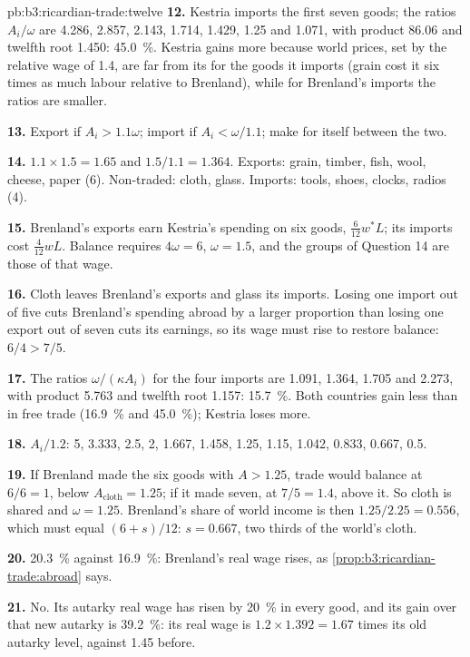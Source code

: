 \begin{solution}{pb:b3:ricardian-trade:twelve}
\textbf{12.} Kestria imports the first seven goods; the ratios $A_i/\omega$ are 4.286,
2.857, 2.143, 1.714, 1.429, 1.25 and 1.071, with product 86.06 and twelfth root 1.450:
45.0~\%. Kestria gains more because world prices, set by the relative wage of 1.4,
are far from its  for the goods it imports (grain cost it six
times as much labour relative to Brenland), while for Brenland's imports the
ratios are smaller.

\textbf{13.} Export if $A_i > 1.1\omega$; import if $A_i < \omega/1.1$; make for itself
between the two.

\textbf{14.} $1.1 \times 1.5 = 1.65$ and $1.5/1.1 = 1.364$. Exports: grain, timber, fish,
wool, cheese, paper (6). Non-traded: cloth, glass. Imports: tools, shoes, clocks,
radios (4).

\textbf{15.} Brenland's exports earn Kestria's spending on six goods, $\tfrac{6}{12}w^*L$;
its imports cost $\tfrac{4}{12}wL$. Balance requires $4\omega = 6$, $\omega = 1.5$, and the
groups of Question 14 are those of that wage.

\textbf{16.} Cloth leaves Brenland's exports and glass its imports. Losing one
import out of five cuts Brenland's spending abroad by a larger proportion than
losing one export out of seven cuts its earnings, so its wage must rise to
restore balance: $6/4 > 7/5$.

\textbf{17.} The ratios $\omega/(\kappa A_i)$ for the four imports are 1.091, 1.364, 1.705
and 2.273, with product 5.763 and twelfth root 1.157: 15.7~\%. Both countries gain
less than in free trade (16.9~\% and 45.0~\%); Kestria loses more.

\textbf{18.} $A_i/1.2$: 5, 3.333, 2.5, 2, 1.667, 1.458, 1.25, 1.15, 1.042, 0.833, 0.667, 0.5.

\textbf{19.} If Brenland made the six goods with $A > 1.25$, trade would balance at
$6/6 = 1$, below $A_{\text{cloth}} = 1.25$; if it made seven, at $7/5 = 1.4$, above it.
So cloth is shared and $\omega = 1.25$. Brenland's share of world income is then
$1.25/2.25 = 0.556$, which must equal $(6 + s)/12$: $s = 0.667$, two thirds of the
world's cloth.

\textbf{20.} 20.3~\% against 16.9~\%: Brenland's real wage rises, as
\cref{prop:b3:ricardian-trade:abroad} says. %

\textbf{21.} No. Its autarky real wage has risen by 20~\% in every good, and its
gain over that new autarky is 39.2~\%: its real wage is $1.2 \times 1.392 = 1.67$ times
its old autarky level, against 1.45 before.


\end{solution}
